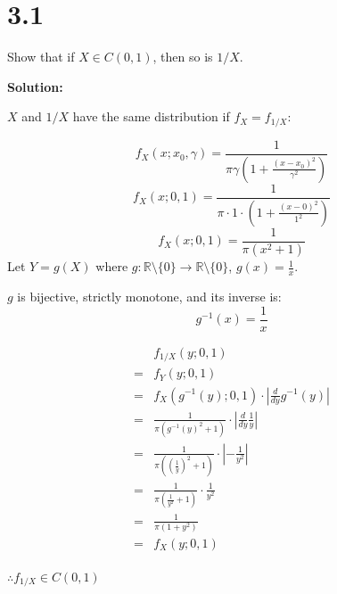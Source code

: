 \documentclass{article}
\begin{document}
\section{3.1}

Show that if \(X \in C(0,1)\), then so is \(1/X\).

\textbf{Solution:}

\(X\) and \(1/X\) have the same distribution if \(f_X=f_{1/X}\):

\[f_X(x;x_0,\gamma) = \frac{1}{\pi\gamma(1+\frac{(x-x_0)^2}{\gamma^2})}\]
\[f_X(x;0,1) = \frac{1}{\pi \cdot 1 \cdot (1+\frac{(x-0)^2}{1^2})}\]
\[f_X(x;0,1) = \frac{1}{\pi (x^2+1)}\]
Let \(Y=g(X)\) where \(g: \mathbb{R}\setminus\{0\}\to\mathbb{R}\setminus\{0\}\), \(g(x) = \frac{1}{x}\).

\(g\) is bijective, strictly monotone, and its inverse is:
\[g^{-1}(x) = \frac{1}{x}\]

\begin{align*}
 & f_{1/X}(y;0,1) \\
=& f_Y(y;0,1) \\
=& f_X(g^{-1}(y);0,1) \cdot |\frac{d}{dy}g^{-1}(y)| \\
=& \frac{1}{\pi (g^{-1}(y)^2+1)} \cdot |\frac{d}{dy}\frac{1}{y}| \\
=& \frac{1}{\pi ((\frac{1}{y})^2+1)} \cdot |-\frac{1}{y^2}| \\
=& \frac{1}{\pi (\frac{1}{y^2}+1)} \cdot \frac{1}{y^2} \\
=& \frac{1}{\pi (1+y^2)} \\
=& f_X(y;0,1) \\
\end{align*}

\(\therefore f_{1/X}\in C(0,1)\)
\end{document}

